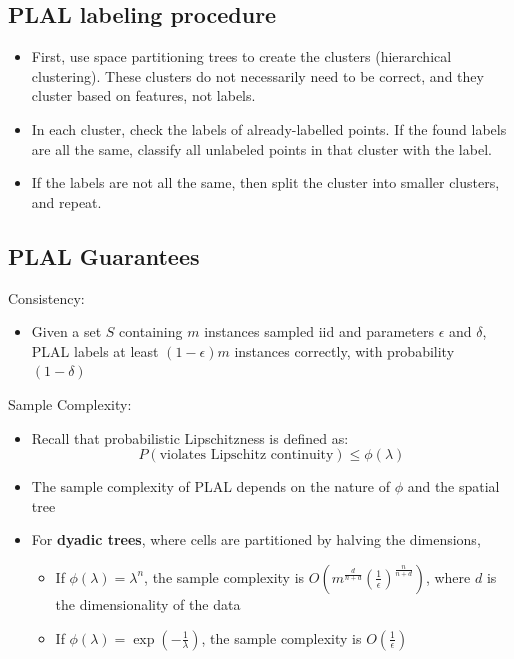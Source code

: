 \documentclass[10pt]{article}
\begin{document}
\subsection*{PLAL labeling procedure}
\begin{itemize}
    \item First, use space partitioning trees to create the clusters  (hierarchical clustering).  These clusters do not necessarily need to be correct, and they cluster based on features, not labels.
	\item In each cluster, check the labels of already-labelled points.  If the found labels are all the same, classify all unlabeled points in that cluster with the label.
	\item If the labels are not all the same, then split the cluster into smaller clusters, and repeat.
\end{itemize}

\subsection*{PLAL Guarantees}
Consistency:
\begin{itemize}
	\item Given a set $S$ containing $m$ instances sampled iid and parameters $\epsilon$ and $\delta$, PLAL labels at least $(1 - \epsilon)m$ instances correctly, with probability $(1 - \delta)$
\end{itemize}
Sample Complexity:
\begin{itemize}
	\item Recall that probabilistic Lipschitzness is defined as:
	\[P(\text{violates Lipschitz continuity}) \leq \phi(\lambda)\]
    \item The sample complexity of PLAL depends on the nature of $\phi$ and the spatial tree
    \item For \textbf{dyadic trees}, where cells are partitioned by halving the dimensions,
    \begin{itemize}
	    \item If $\phi(\lambda) = \lambda^n$, the sample complexity is $O\left(m^{\frac{d}{n + d}} \left(\frac{1}{\epsilon}\right)^{\frac{n}{n + d}}\right)$, where $d$ is the dimensionality of the data
	    \item If $\phi(\lambda) = \exp \left(-\frac{1}{\lambda}\right)$, the sample complexity is $O\left(\frac{1}{\epsilon}\right)$
    \end{itemize}
\end{itemize}
\end{document}
